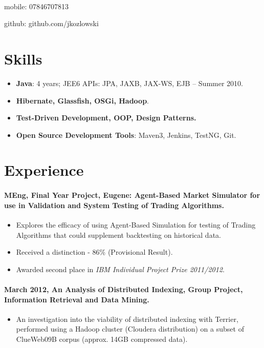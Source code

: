 \documentclass[11pt, a4paper]{article}
\newlength{\wideitemsep}
\let\olditem\item
\renewcommand{\item}{\setlength{\itemsep}{\wideitemsep}\olditem}
\begin{document}
\textsf{\\[0.1in]}

\begin{minipage}[b]{2in}
\small{mobile: 07846707813}
\end{minipage}
\begin{minipage}[b]{2in}
\end{minipage}
\begin{minipage}[b]{2.5in}
\begin{flushright}\small{github: github.com/jkozlowski}\end{flushright}
\end{minipage}

\section*{Skills}
\begin{itemize}
\item \textbf{Java}: 4 years; JEE6 APIs: JPA, JAXB, JAX-WS, EJB – Summer 2010.
\item \textbf{Hibernate, Glassfish, OSGi, Hadoop}.
\item \textbf{Test-Driven Development, OOP, Design Patterns.}
\item \textbf{Open Source Development Tools}: Maven3, Jenkins, TestNG, Git.
\end{itemize}

\section*{Experience}
\paragraph{MEng, Final Year Project, Eugene: Agent-Based Market Simulator for use in Validation and System Testing of Trading Algorithms.} 
\begin{itemize}
\item Explores the efficacy of using Agent-Based Simulation for testing of Trading Algorithms that could supplement backtesting on historical data.
\item Received a distinction - 86\% (Provisional Result).
\item Awarded second place in \textit{IBM Individual Project Prize 2011/2012}.
\end{itemize}

\paragraph{March 2012, An Analysis of Distributed Indexing, Group Project, Information Retrieval and Data Mining.}
\begin{itemize}
\item An investigation into the viability of distributed indexing with Terrier, performed using a Hadoop cluster (Cloudera distribution) on a subset of ClueWeb09B corpus (approx. 14GB compressed data).\end{itemize}
\end{document}
